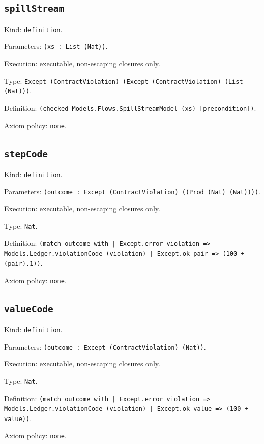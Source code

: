\documentclass[11pt]{article}
\begin{document}
\subsection*{\texttt{spillStream}}
\noindent Kind: \texttt{definition}.\par
\noindent Parameters: \texttt{(xs : List (Nat))}.\par
\noindent Execution: executable, non-escaping closures only.\par
\noindent Type: \texttt{Except (ContractViolation) (Except (ContractViolation) (List (Nat)))}.\par
\noindent Definition: \texttt{(checked Models.Flows.SpillStreamModel (xs) [precondition])}.\par
\noindent Axiom policy: \texttt{none}.\par
\subsection*{\texttt{stepCode}}
\noindent Kind: \texttt{definition}.\par
\noindent Parameters: \texttt{(outcome : Except (ContractViolation) ((Prod (Nat) (Nat))))}.\par
\noindent Execution: executable, non-escaping closures only.\par
\noindent Type: \texttt{Nat}.\par
\noindent Definition: \texttt{(match outcome with | Except.error violation => Models.Ledger.violationCode (violation) | Except.ok pair => (100 + (pair).1))}.\par
\noindent Axiom policy: \texttt{none}.\par
\subsection*{\texttt{valueCode}}
\noindent Kind: \texttt{definition}.\par
\noindent Parameters: \texttt{(outcome : Except (ContractViolation) (Nat))}.\par
\noindent Execution: executable, non-escaping closures only.\par
\noindent Type: \texttt{Nat}.\par
\noindent Definition: \texttt{(match outcome with | Except.error violation => Models.Ledger.violationCode (violation) | Except.ok value => (100 + value))}.\par
\noindent Axiom policy: \texttt{none}.\par
\end{document}
